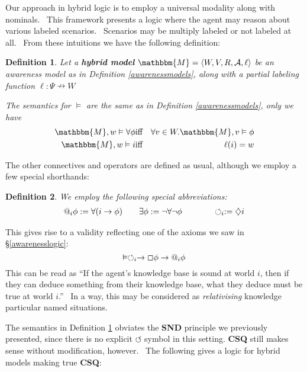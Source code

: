 \documentclass{acmconf}
\newcommand{\assign}{:=}
\newcommand{\tmem}[1]{{\em #1\/}}
\newcommand{\tmtextbf}[1]{{\bfseries{#1}}}
\newcommand{\tmtextup}[1]{{\upshape{#1}}}
\newtheorem{definition}{Definition}
\begin{document}
Our approach in hybrid logic is to employ a universal modality along with
nominals. \ This framework presents a logic where the agent may reason about
various labeled scenarios. \ Scenarios may be multiply labeled or not labeled
at all. \ From these intuitions we have the following definition:

\begin{definition}
  \label{hybridsemantics}Let a \tmtextbf{hybrid model} $\mathbbm{M}= \langle
  W, V, R, \mathcal{A}, \ell \rangle$ be an awareness model as in Definition
  \ref{awarenessmodels}, along with a partial labeling function $\ell : \Psi
  \nrightarrow W$
  
  
  
  The semantics for $\vDash$ are the same as in Definition
  \ref{awarenessmodels}, only we have
  \begin{eqnarray*}
    \mathbbm{M}, w \vDash \forall \phi & \text{iff} & \forall v \in
    W.\mathbbm{M}, v \vDash \phi\\
    \mathbbm{M}, w \vDash i & \text{iff} & \ell (i) = w
  \end{eqnarray*}
\end{definition}

The other connectives and operators are defined as usual, although we employ a
few special shorthands:

\begin{definition}
  We employ the following special abbreviations:
  \begin{eqnarray}
    \text{\tmtextup{@}}_i \phi \assign \forall (i \rightarrow \phi)
    \hspace{2em} & \exists \phi \assign \neg \forall \neg \phi \hspace{3em} &
    \circlearrowleft_i \assign \diamondsuit i \nonumber
  \end{eqnarray}
\end{definition}

This gives rise to a validity reflecting one of the axioms we saw in
{\S}\ref{awarenesslogic}:
\[ \vDash \circlearrowleft_i \rightarrow \Box \phi \rightarrow
   \text{\tmtextup{@}}_i \phi \]
This can be read as ``If the agent's knowledge base is sound at world $i$,
then if they can deduce something from their knowledge base, what they deduce
must be true at world $i$.'' \ In a way, this may be considered as
{\tmem{relativising}} knowledge particular named situations.



The semantics in Definition \ref{hybridsemantics} obviates the \tmtextbf{SND}
principle we previously presented, since there is no explicit
$\circlearrowleft$ symbol in this setting. \tmtextbf{CSQ} still makes sense
without modification, however. \ The following gives a logic for hybrid models
making true \tmtextbf{CSQ}:
\end{document}
